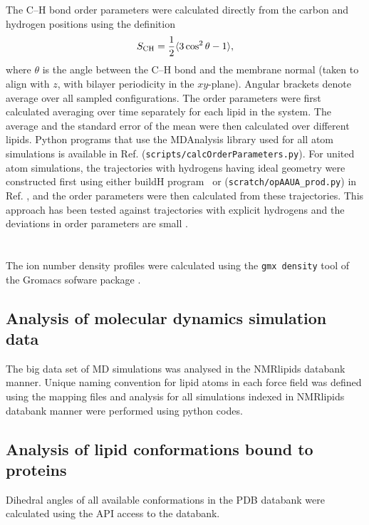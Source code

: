 \documentclass[aps,prl,superscriptaddress,twocolumn]{revtex4}
\begin{document}
The C--H bond order parameters were calculated directly
from the carbon and hydrogen positions using the definition
\begin{equation}
S_{\rm CH}=\frac{1}{2}\langle 3\cos^2\theta -1 \rangle,
\end{equation}
where $\theta$ is the angle between the C--H bond and the membrane normal
(taken to align with $z$, with bilayer periodicity in the $xy$-plane).
Angular brackets denote average over all sampled configurations.
The order parameters were first calculated averaging over time separately
for each lipid in the system. The average and
the standard error of the mean were then calculated over different lipids.
Python programs that use the MDAnalysis library \cite{agrawal11,gowers16}
used for all atom simulations is available in Ref. 
({\tt scripts/calcOrderParameters.py}). For united atom simulations, the trajectories
with hydrogens having ideal geometry were constructed first using either buildH program~\cite{buildH}
or ({\tt scratch/opAAUA\_prod.py}) in  Ref. , and the order parameters were
then calculated from these trajectories. This approach has been tested against trajectories
with explicit hydrogens and the deviations in order parameters are small \cite{buildH,piggot17}.\\
\\
\\
The ion number density profiles were calculated using the {\tt gmx density} tool
of the Gromacs sofware package \cite{gromacsMANUAL}.

\subsection{Analysis of molecular dynamics simulation data}
The big data set of MD simulations was analysed in the NMRlipids databank manner.
Unique naming convention for lipid atoms in each force field was defined using the mapping files
and analysis for all simulations indexed in NMRlipids databank manner were performed
using python codes.

\subsection{Analysis of lipid conformations bound to proteins}
Dihedral angles of all available conformations in the PDB databank were calculated using the
API access to the databank.
\end{document}
